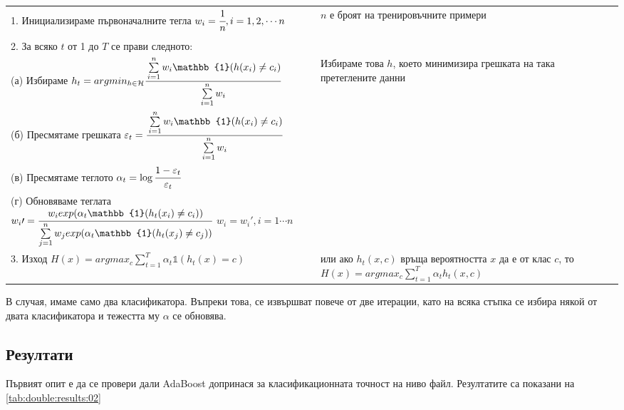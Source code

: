 \documentclass[main.tex]{subfiles}
\begin{document}
\begin{exampleenv}
\begin{tabular}{p{}|p{}}
    \makecell[l]{1. Инициализираме първоначалните тегла\\$w_i = \cfrac{1}{n}, i = 1, 2,\cdots n$} & \footnotesize{$n$ е броят на тренировъчните примери}\\
    & \\
    2. За всяко $t$ от 1 до $T$ се прави следното: & \\
    \qquad (а) Избираме $h_t = argmin_{h \in \mathcal{H}}\cfrac{\sum\limits_{i=1}^n w_i \mathbb{1}(h(x_i) \neq c_i)}{\sum\limits_{i=1}^n w_i}$ & \footnotesize{Избираме това $h$, което минимизира грешката на така претеглените данни}\\
    \makecell[l]{\qquad (б) Пресмятаме грешката\\\qquad $\varepsilon_t = \cfrac{\sum\limits_{i=1}^n w_i \mathbb{1}(h(x_i) \neq c_i)}{\sum\limits_{i=1}^n w_i}$} & \\
    \makecell[l]{\qquad (в) Пресмятаме теглото\\\qquad $\alpha_t = \log\cfrac{1 - \varepsilon_t}{\varepsilon_t}$} & \\
    \makecell[l]{\qquad (г) Обновяваме теглата\\\qquad $w_i\prime = \cfrac{w_i exp(\alpha_t \mathbb{1}(h_t(x_i) \neq c_i))}{\sum\limits_{j=1}^n w_j exp(\alpha_t \mathbb{1}(h_t(x_j) \neq c_j))}$\\\qquad$w_i = w_i\prime, i = 1\cdots n$} & \\
    3. Изход $H(x) = argmax_c \sum\limits_{t=1}^T \alpha_t \mathbb{1}(h_t(x) = c)$ & \footnotesize{или ако $h_t(x, c)$ връща вероятността $x$ да е от клас $c$, то $H(x) = argmax_c \sum\limits_{t=1}^T \alpha_t h_t(x, c)$}
\end{tabular}
\end{exampleenv}

В случая, имаме само два класификатора. Въпреки това, се извършват повече от две итерации, като на всяка стъпка се избира някой от двата класификатора и тежестта му $\alpha$ се обновява.

\subsection{Резултати}

Първият опит е да се провери дали AdaBoost допринася за класификационната точност на ниво файл. Резултатите са показани на \autoref{tab:double:results:02}
\end{document}
